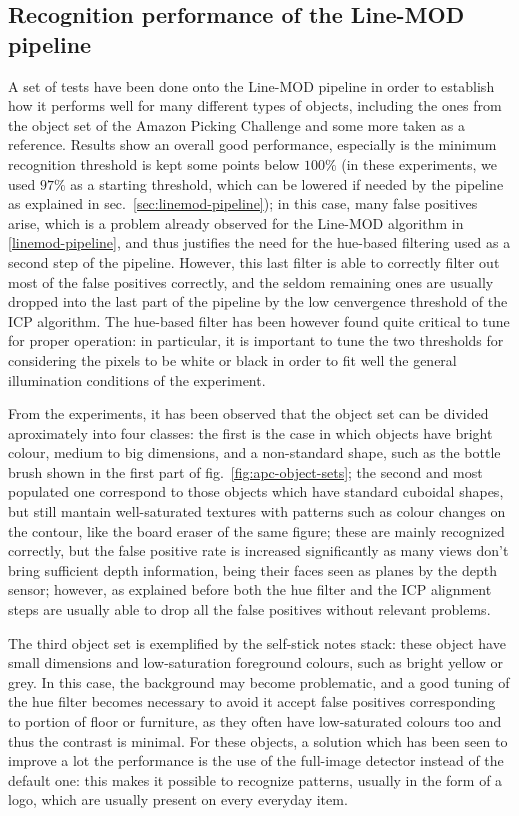 \subsection{Recognition performance of the Line-MOD pipeline}
A set of tests have been done onto the Line-MOD pipeline in order to
establish how it performs well for many different types of objects,
including the ones from the object set of the Amazon Picking Challenge
and some more taken as a reference. Results show an overall good
performance, especially is the minimum recognition threshold is kept
some points below $100\%$ (in these experiments, we used $97\%$ as a
starting threshold, which can be lowered if needed by the pipeline as
explained in sec.~\ref{sec:linemod-pipeline}); in this case, many
false positives arise, which is a problem already observed for the
Line-MOD algorithm in \ref{linemod-pipeline}, and thus justifies the
need for the hue-based filtering used as a second step of the
pipeline. However, this last filter is able to correctly filter out
most of the false positives correctly, and the seldom remaining ones
are usually dropped into the last part of the pipeline by the low
cenvergence threshold of the ICP algorithm. The hue-based filter
has been however found quite critical to tune for proper operation: in
particular, it is important to tune the two thresholds for considering
the pixels to be white or black in order to fit well the general
illumination conditions of the experiment.

From the experiments, it has been observed that the object set can be
divided aproximately into four classes: the first is the case in which
objects have bright colour, medium to big dimensions, and a
non-standard shape, such as the bottle brush shown in the first part
of fig.~\ref{fig:apc-object-sets}; the second and most populated one correspond to those
objects which have standard cuboidal shapes, but still mantain
well-saturated textures with patterns such as colour changes on the
contour, like the board eraser of the same figure; these are mainly
recognized correctly, but the false positive rate is increased
significantly as many views don't bring sufficient depth information,
being their faces seen as planes by the depth sensor; however, as
explained before both the hue filter and the ICP alignment steps are
usually able to drop all the false positives without relevant
problems.

The third object set is exemplified by the self-stick notes stack:
these object have small dimensions and low-saturation foreground
colours, such as bright yellow or grey. In this case, the background
may become problematic, and a good tuning of the hue filter becomes
necessary to avoid it accept false positives corresponding to portion
of floor or furniture, as they often have low-saturated colours too
and thus the contrast is minimal. For these objects, a solution which
has been seen to improve a lot the performance is the use of the
full-image detector instead of the default one: this makes it possible
to recognize patterns, usually in the form of a logo, which are
usually present on every everyday item.


